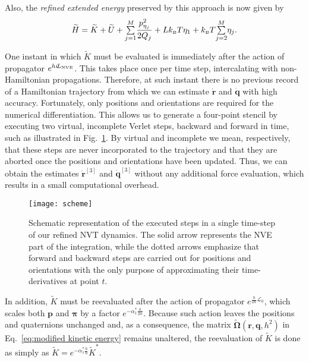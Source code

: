 \documentclass[
	aip,
	jcp,
	reprint,
]{revtex4-1}
\newcommand{\vt}[1]{\boldsymbol{\mathbf{#1}}}          %
\newcommand{\Liu}[1]{i\!L_\text{#1}}                   %
\newcommand{\timestep}{h}
\newcommand{\refined}[1]{\widetilde{#1}}
\newcommand{\mini}[1]{\text{\tiny{#1}}}
\begin{document}
Also, the \textit{refined extended energy} preserved by this approach is now given by
\begin{equation}
\label{eq:this extended energy}
{\refined H} = \refined K + \refined U + {\textstyle\sum\limits_{j=1}^{M}} \frac{p_{\eta_j}^2}{2Q_j} + L k_\mini{B} T\eta_1 + k_\mini{B} T {\textstyle\sum\limits_{j=2}^{M}} \eta_j.
\end{equation}

One instant in which $\refined K$ must be evaluated is immediately after the action of propagator $e^{\timestep \Liu{\tiny NVE}}$.
This takes place once per time step, intercalating with non-Hamiltonian propagations.
Therefore, at such instant there is no previous record of a Hamiltonian trajectory from which we can estimate $\dot{\vt r}$ and $\dot{\vt q}$ with high accuracy.
Fortunately, only positions and orientations are required for the numerical differentiation.
This allows us to generate a four-point stencil by executing two virtual, incomplete Verlet steps, backward and forward in time, such as illustrated in Fig.~\ref{fig:virtual steps}.
By virtual and incomplete we mean, respectively, that these steps are never incorporated to the trajectory and that they are aborted once the positions and orientations have been updated.
Thus, we can obtain the estimates $\dot{\vt r}^{[3]}$ and $\dot{\vt q}^{[3]}$ without any additional force evaluation, which results in a small computational overhead.

\begin{figure}
	\texttt{[image: scheme]}
	\caption{Schematic representation of the executed steps in a single time-step of our refined NVT dynamics. The solid arrow represents the NVE part of the integration, while the dotted arrows emphasize that forward and backward steps are carried out for positions and orientations with the only purpose of approximating their time-derivatives at point $t$.}
	\label{fig:virtual steps}
\end{figure}

In addition, $\refined K$ must be reevaluated after the action of propagator $e^{\frac{\timestep}{2n} {\mathcal L}_0}$, which scales both $\vt p$ and $\vt \pi$ by a factor $e^{-\alpha_1^\ast \frac{\timestep}{2n}}$.
Because such action leaves the positions and quaternions unchanged and, as a consequence, the matrix $\refined{\mathbf \Omega}(\vt r, \vt q, \timestep^2)$ in Eq.~\eqref{eq:modified kinetic energy} remains unaltered, the reevaluation of $\refined K$ is done as simply as ${\refined K} = e^{-\alpha_1^\ast \frac{\timestep}{n}} {\refined K}^\ast$.
\end{document}
